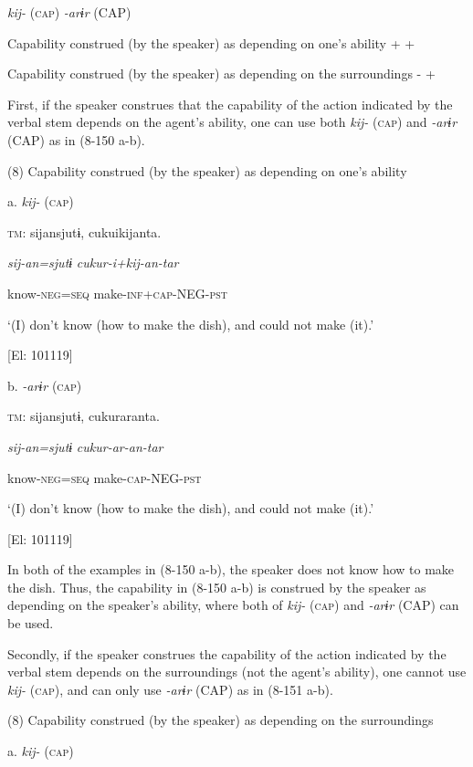   \textit{kij-} (\textsc{cap})  \textit{{}-arɨr} (CAP)

Capability construed (by the speaker) as depending on one’s ability  +  +

Capability construed (by the speaker) as depending on the surroundings  {}-  +

First, if the speaker construes that the capability of the action indicated by the verbal stem depends on the agent’s ability, one can use both \textit{kij-} (\textsc{cap}) and \textit{{}-arɨr} (CAP) as in (8-150 a-b).

(8)  Capability construed (by the speaker) as depending on one’s ability

  a. \textit{kij-} (\textsc{cap})

  \textsc{tm}:  sijansjutɨ,  cukuikijanta.

    \textit{sij-an=sjutɨ}  \textit{cukur-i+kij{}-an-tar}

    know-\textsc{neg}=\textsc{seq}  make-\textsc{inf}+\textsc{cap}-NEG-\textsc{pst}

    ‘(I) don’t know (how to make the dish), and could not make (it).’

    [El: 101119]

  b. \textit{{}-arɨr} (\textsc{cap})

  \textsc{tm}:  sijansjutɨ,  cukuraranta.

    \textit{sij-an=sjutɨ}  \textit{cukur-ar{}-an-tar}

    know-\textsc{neg}=\textsc{seq}  make-\textsc{cap}-NEG-\textsc{pst}

    ‘(I) don’t know (how to make the dish), and could not make (it).’

    [El: 101119]

In both of the examples in (8-150 a-b), the speaker does not know how to make the dish. Thus, the capability in (8-150 a-b) is construed by the speaker as depending on the speaker’s ability, where both of \textit{kij-} (\textsc{cap}) and \textit{{}-arɨr} (CAP) can be used.

Secondly, if the speaker construes the capability of the action indicated by the verbal stem depends on the surroundings (not the agent’s ability), one cannot use \textit{kij-} (\textsc{cap}), and can only use \textit{{}-arɨr} (CAP) as in (8-151 a-b).

(8)  Capability construed (by the speaker) as depending on the surroundings

  a. \textit{kij-} (\textsc{cap})


